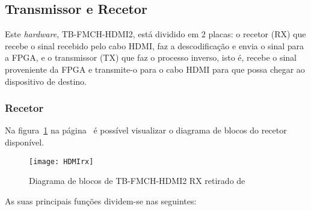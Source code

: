\subsection{Transmissor e Recetor} \label{subsec:TXandRX}
Este \textit{hardware}, TB-FMCH-HDMI2, está dividido em 2 placas: o recetor (RX) que recebe o sinal recebido pelo cabo HDMI, faz a descodificação e envia o sinal para a FPGA, e o transmissor (TX) que faz o processo inverso, isto é, recebe o sinal proveniente da FPGA e transmite-o para o cabo HDMI para que possa chegar ao dispositivo de destino. 
\subsubsection{Recetor}\label{subsubsec:RX}
Na figura~\ref{fig:HDMIblocosRX} na página~\pageref{fig:HDMIblocosRX} é possível visualizar o diagrama de blocos do recetor disponível.
\begin{figure}[h!]
	\begin{center}
		\leavevmode
		\texttt{[image: HDMIrx]}
		\caption{Diagrama de blocos de TB-FMCH-HDMI2 RX retirado de \cite{R009}}
		\label{fig:HDMIblocosRX}
	\end{center}
\end{figure}
As suas principais funções dividem-se nas seguintes:
